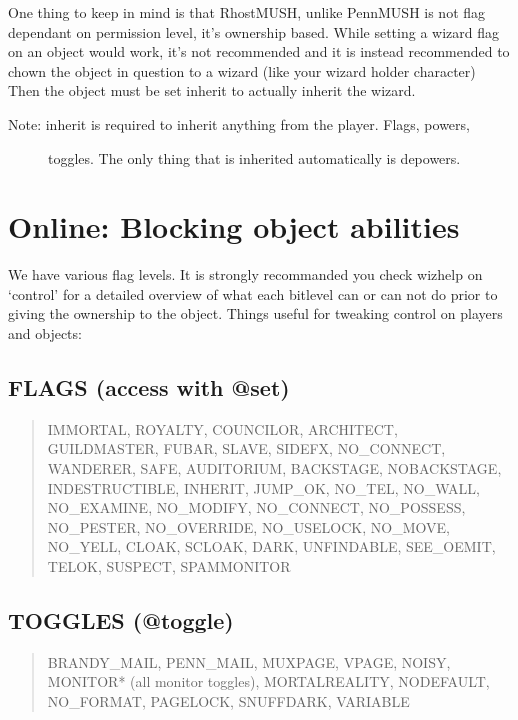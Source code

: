 \documentclass[letterpaper,10pt,english]{sphinxmanual}
\begin{document}
\sphinxAtStartPar
One thing to keep in mind is that RhostMUSH, unlike PennMUSH is not flag
dependant on permission level, it’s ownership based.  While setting a wizard
flag on an object would work, it’s not recommended and it is instead recommended
to chown the object in question to a wizard (like your wizard holder character)
Then the object must be set inherit to actually inherit the wizard.
\begin{description}
\item[{Note: inherit is required to inherit anything from the player.  Flags, powers,}] \leavevmode
\sphinxAtStartPar
toggles.  The only thing that is inherited automatically is depowers.

\end{description}


\section{Online: Blocking object abilities}
\label{\detokenize{06-security:online-blocking-object-abilities}}
\sphinxAtStartPar
We have various flag levels.  It is strongly recommanded you check wizhelp
on ‘control’ for a detailed overview of what each bitlevel can or can not do
prior to giving the ownership to the object.  Things useful for tweaking control
on players and objects:


\subsection{FLAGS (access with @set)}
\label{\detokenize{06-security:flags-access-with-set}}\begin{quote}

\sphinxAtStartPar
IMMORTAL, ROYALTY, COUNCILOR, ARCHITECT, GUILDMASTER,
FUBAR, SLAVE, SIDEFX, NO\_CONNECT, WANDERER, SAFE,
AUDITORIUM, BACKSTAGE, NOBACKSTAGE, INDESTRUCTIBLE,
INHERIT, JUMP\_OK, NO\_TEL, NO\_WALL, NO\_EXAMINE,
NO\_MODIFY, NO\_CONNECT, NO\_POSSESS, NO\_PESTER,
NO\_OVERRIDE, NO\_USELOCK, NO\_MOVE, NO\_YELL, CLOAK,
SCLOAK, DARK, UNFINDABLE, SEE\_OEMIT, TELOK, SUSPECT,
SPAMMONITOR
\end{quote}


\subsection{TOGGLES (@toggle)}
\label{\detokenize{06-security:toggles-toggle}}\begin{quote}

\sphinxAtStartPar
BRANDY\_MAIL, PENN\_MAIL, MUXPAGE, VPAGE, NOISY,
MONITOR* (all monitor toggles), MORTALREALITY,
NODEFAULT, NO\_FORMAT, PAGELOCK, SNUFFDARK, VARIABLE
\end{quote}
\end{document}
